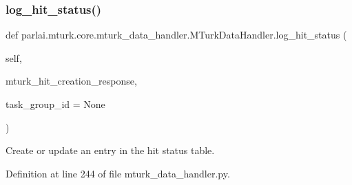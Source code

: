 \subsubsection{\texorpdfstring{log\+\_\+hit\+\_\+status()}{log\_hit\_status()}}
{\footnotesize\ttfamily def parlai.\+mturk.\+core.\+mturk\+\_\+data\+\_\+handler.\+M\+Turk\+Data\+Handler.\+log\+\_\+hit\+\_\+status (\begin{DoxyParamCaption}\item[{}]{self,  }\item[{}]{mturk\+\_\+hit\+\_\+creation\+\_\+response,  }\item[{}]{task\+\_\+group\+\_\+id = {\ttfamily None} }\end{DoxyParamCaption})}

\begin{DoxyVerb}Create or update an entry in the hit status table.
\end{DoxyVerb}
 

Definition at line 244 of file mturk\+\_\+data\+\_\+handler.\+py.


